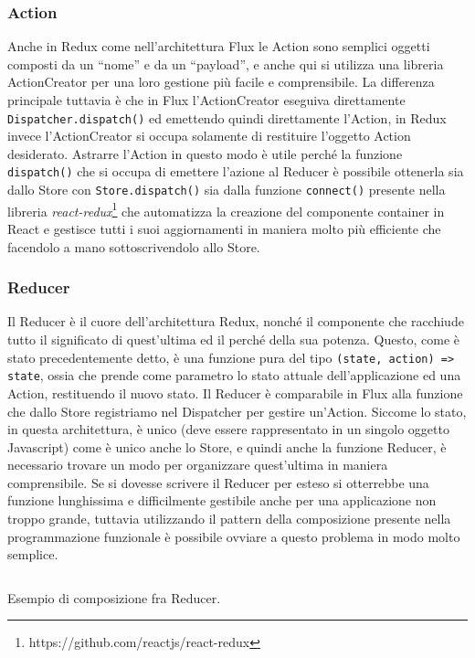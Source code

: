 \subsubsection*{Action}
Anche in Redux come nell'architettura Flux le Action sono semplici oggetti composti da un “nome” e da un “payload”, e anche qui si utilizza una libreria ActionCreator per una loro gestione più facile e comprensibile. La differenza principale tuttavia è che in Flux l'ActionCreator eseguiva direttamente \texttt{Dispatcher.dispatch()} ed emettendo quindi direttamente l'Action, in Redux invece l'ActionCreator si occupa solamente di restituire l'oggetto Action desiderato. Astrarre l'Action in questo modo è utile perché la funzione \texttt{dispatch()} che si occupa di emettere l'azione al Reducer è possibile ottenerla sia dallo Store con \texttt{Store.dispatch()} sia dalla funzione \texttt{connect()} presente nella libreria \textit{react-redux}\footnote{https://github.com/reactjs/react-redux} che automatizza la creazione del componente container in React e gestisce tutti i suoi aggiornamenti in maniera molto più efficiente che facendolo a mano sottoscrivendolo allo Store.

\subsubsection*{Reducer}
Il Reducer è il cuore dell'architettura Redux, nonché il componente che racchiude tutto il significato di quest'ultima ed il perché della sua potenza. Questo, come è stato precedentemente detto, è una funzione pura del tipo \texttt{(state, action) => state}, ossia che prende come parametro lo stato attuale dell'applicazione ed una Action, restituendo il nuovo stato. Il Reducer è comparabile in Flux alla funzione che dallo Store registriamo nel Dispatcher per gestire un'Action.
Siccome lo stato, in questa architettura, è unico (deve essere rappresentato in un singolo oggetto Javascript) come è unico anche lo Store, e quindi anche la funzione Reducer, è necessario trovare un modo per organizzare quest'ultima in maniera comprensibile. Se si dovesse scrivere il Reducer per esteso si otterrebbe una funzione lunghissima e difficilmente gestibile anche per una applicazione non troppo grande, tuttavia utilizzando il pattern della composizione presente nella programmazione funzionale è possibile ovviare a questo problema in modo molto semplice.

\begin{listing}[ht]
\inputminted{javascript}{sources/exampleReduxReducer.js}
\caption{Esempio di composizione fra Reducer.} 
\label{exampleReduxReducer} 
\end{listing}


